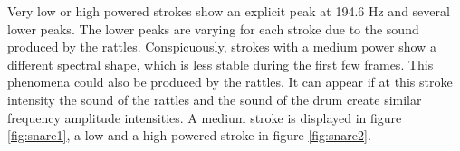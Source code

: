 Very low or high powered strokes show an explicit peak at 194.6 Hz and several lower peaks. The lower peaks are varying for each stroke due to the sound produced by the rattles. Conspicuously, strokes with a medium power show a different spectral shape, which is less stable during the first few frames. This phenomena could also be produced by the rattles. It can appear if at this stroke intensity the sound of the rattles and the sound of the drum create similar frequency amplitude intensities. A medium stroke is displayed in figure \ref{fig:snare1}, a low and a high powered stroke in figure \ref{fig:snare2}.

\begin{figure}
	\centering
	\qquad
\end{figure}
